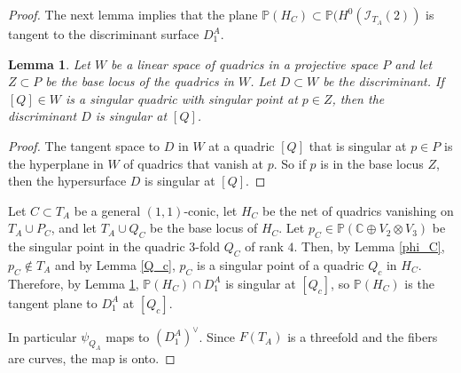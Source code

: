 \documentclass[a4paper,11pt]{amsart}
\newtheorem{lemma}[thm]{Lemma}
\theoremstyle{definition}
\numberwithin{equation}{section}
\numberwithin{equation}{section} \theoremstyle{definition}
\begin{document}
\begin{proof}
The next lemma implies that the plane ${{\mathbb{P}}}(H_C)\subset  {{\mathbb{P}}}(H^0({\mathcal I}_{T_A}(2))$ is tangent to the discriminant surface $D_1^A$.
\begin{lemma}\label{singdisc} Let $W$ be a linear space of quadrics in a projective space  $P$ and let $Z\subset P$  be the base locus of the quadrics in $W$. Let $D\subset W$ be the discriminant.  If $[Q]\in W$ is a singular quadric with singular point at $p\in Z$, then the discriminant $D$ is singular at $[Q]$.  
\end{lemma}
\begin{proof}The tangent space to $D$ in $W$ at a quadric $[Q]$ that is singular at $p\in P$ is the hyperplane in $W$ of quadrics that vanish at $p$.  So if $p$ is in the base locus $Z$, then the hypersurface $D$ is singular at $[Q]$.
\end{proof}

Let $C\subset T_A$ be a general $(1,1)$-conic, let  $H_C$ be the net of quadrics vanishing on $T_A\cup P_C$, and let $T_A\cup Q_C$ be the base locus of $H_C$.
Let $p_C\in {{\mathbb{P}}}({{\mathbb{C}  }}\oplus V_2\otimes V_3)$ be the singular point in the quadric $3$-fold $Q_C$ of rank $4$. Then, by Lemma \ref{phi_C}, $p_C\notin T_A$ and by Lemma \ref{Q_c}, $p_C$ is a singular point of a quadric $Q_c$ in $H_C$.  Therefore, by Lemma \ref{singdisc}, ${{\mathbb{P}}}(H_{C})\cap D_1^A$ is singular at $[Q_c]$, so ${{\mathbb{P}}}(H_{C})$ is the tangent plane to $D_1^A$ at $[Q_c]$.

In particular $\psi_{Q_A}$ maps to 
 $(D_1^A)^\vee$.  Since $F(T_A)$ is a threefold and the fibers are curves, the map is onto. 
 

 
\end{proof}
\end{document}
